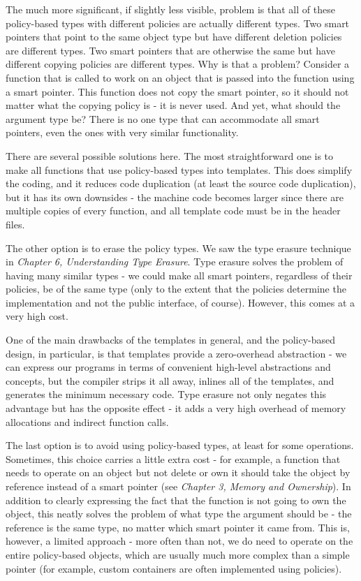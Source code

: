 The much more significant, if slightly less visible, problem is that all of these policy-based types with different policies are actually different types. Two smart pointers that point to the same object type but have different deletion policies are different types. Two smart pointers that are otherwise the same but have different copying policies are different types. Why is that a problem? Consider a function that is called to work on an object that is passed into the function using a smart pointer. This function does not copy the smart pointer, so it should not matter what the copying policy is - it is never used. And yet, what should the argument type be? There is no one type that can accommodate all smart pointers, even the ones with very similar functionality.

There are several possible solutions here. The most straightforward one is to make all functions that use policy-based types into templates. This does simplify the coding, and it reduces code duplication (at least the source code duplication), but it has its own downsides - the machine code becomes larger since there are multiple copies of every function, and all template code must be in the header files.

The other option is to erase the policy types. We saw the type erasure technique in \emph{Chapter 6, Understanding Type Erasure}. Type erasure solves the problem of having many similar types - we could make all smart pointers, regardless of their policies, be of the same type (only to the extent that the policies determine the implementation and not the public interface, of course). However, this comes at a very high cost.

One of the main drawbacks of the templates in general, and the policy-based design, in particular, is that templates provide a zero-overhead abstraction - we can express our programs in terms of convenient high-level abstractions and concepts, but the compiler strips it all away, inlines all of the templates, and generates the minimum necessary code. Type erasure not only negates this advantage but has the opposite effect - it adds a very high overhead of memory allocations and indirect function calls.

The last option is to avoid using policy-based types, at least for some operations. Sometimes, this choice carries a little extra cost - for example, a function that needs to operate on an object but not delete or own it should take the object by reference instead of a smart pointer (see \emph{Chapter 3, Memory and Ownership}). In addition to clearly expressing the fact that the function is not going to own the object, this neatly solves the problem of what type the argument should be - the reference is the same type, no matter which smart pointer it came from. This is, however, a limited approach - more often than not, we do need to operate on the entire policy-based objects, which are usually much more complex than a simple pointer (for example, custom containers are often implemented using policies).

